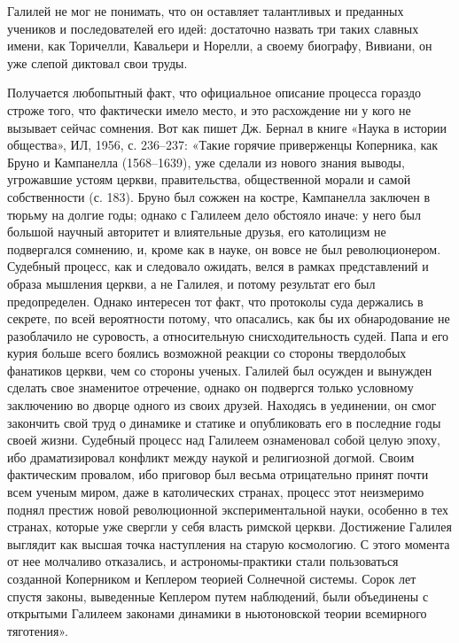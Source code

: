 Галилей не мог не понимать, что он оставляет талантливых и преданных учеников и
последователей его идей: достаточно назвать три таких славных имени, как
Торичелли, Кавальери и Норелли, а своему биографу, Вивиани, он уже слепой
диктовал свои труды.

Получается любопытный факт, что официальное описание процесса гораздо строже
того, что фактически имело место, и это расхождение ни у кого не вызывает
сейчас сомнения. Вот как пишет Дж. Бернал в книге «Наука в истории общества»,
ИЛ, 1956, с. 236--237: «Такие горячие приверженцы Коперника, как Бруно и
Кампанелла (1568--1639), уже сделали из нового знания выводы, угрожавшие устоям
церкви, правительства, общественной морали и самой собственности (с. 183).
Бруно был сожжен на костре, Кампанелла заключен в тюрьму на долгие годы; однако
с Галилеем дело обстояло иначе: у него был большой научный авторитет и
влиятельные друзья, его католицизм не подвергался сомнению, и, кроме как в
науке, он вовсе не был революционером. Судебный процесс, как и следовало
ожидать, велся в рамках представлений и образа мышления церкви, а не Галилея, и
потому результат его был предопределен. Однако интересен тот факт, что
протоколы суда держались в секрете, по всей вероятности потому, что опасались,
как бы их обнародование не разоблачило не суровость, а относительную
снисходительность судей. Папа и его курия больше всего боялись возможной
реакции со стороны твердолобых фанатиков церкви, чем со стороны ученых. Галилей
был осужден и вынужден сделать свое знаменитое отречение, однако он подвергся
только условному заключению во дворце одного из своих друзей. Находясь в
уединении, он смог закончить свой труд о динамике и статике и опубликовать его
в последние годы своей жизни. Судебный процесс над Галилеем ознаменовал собой
целую эпоху, ибо драматизировал конфликт между наукой и религиозной догмой.
Своим фактическим провалом, ибо приговор был весьма отрицательно принят почти
всем ученым миром, даже в католических странах, процесс этот неизмеримо поднял
престиж новой революционной экспериментальной науки, особенно в тех странах,
которые уже свергли у себя власть римской церкви. Достижение Галилея выглядит
как высшая точка наступления на старую космологию. С этого момента от нее
молчаливо отказались, и астрономы-практики стали пользоваться созданной
Коперником и Кеплером теорией Солнечной системы. Сорок лет спустя законы,
выведенные Кеплером путем наблюдений, были объединены с открытыми Галилеем
законами динамики в ньютоновской теории всемирного тяготения».

